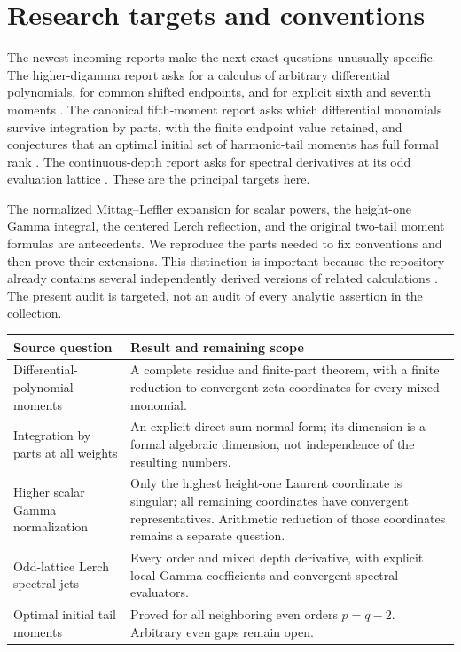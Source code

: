 \documentclass[11pt,a4paper]{article}
\numberwithin{equation}{section}
\theoremstyle{definition}
\theoremstyle{remark}
\begin{document}
\section{Research targets and conventions}
\label{poly:scope}

The newest incoming reports make the next exact questions unusually
specific. The higher-digamma report asks for a calculus of arbitrary
differential polynomials, for common shifted endpoints, and for explicit
sixth and seventh moments \cite{Higher}. The canonical fifth-moment report
asks which differential monomials survive integration by parts, with the
finite endpoint value retained, and conjectures that an optimal initial
set of harmonic-tail moments has full formal rank \cite{Fifth}.
The continuous-depth report asks for spectral derivatives at its odd
evaluation lattice \cite{Continuous}. These are the principal targets here.

The normalized Mittag--Leffler expansion for scalar powers, the
height-one Gamma integral, the centered Lerch reflection, and the original
two-tail moment formulas are antecedents. We reproduce the parts needed
to fix conventions and then prove their extensions. This distinction is
important because the repository already contains several independently
derived versions of related calculations \cite{Repo,Mixed,Tilted,Algebraic}.
The present audit is targeted, not an audit of every analytic assertion in
the collection.

\begin{center}
\small
\begin{tabular}{p{}p{}}
\toprule
Source question & Result and remaining scope\\
\midrule
Differential-polynomial moments & A complete residue and finite-part
theorem, with a finite reduction to convergent zeta coordinates for every
mixed monomial.\\[4pt]
Integration by parts at all weights & An explicit direct-sum normal form;
its dimension is a formal algebraic dimension, not independence of
the resulting numbers.\\[4pt]
Higher scalar Gamma normalization & Only the highest height-one Laurent
coordinate is singular; all remaining coordinates have convergent
representatives. Arithmetic reduction of those coordinates remains a
separate question.\\[4pt]
Odd-lattice Lerch spectral jets & Every order and mixed depth derivative,
with explicit local Gamma coefficients and convergent spectral evaluators.\\[4pt]
Optimal initial tail moments & Proved for all neighboring even orders
$p=q-2$. Arbitrary even gaps remain open.\\
\bottomrule
\end{tabular}
\end{center}
\end{document}
